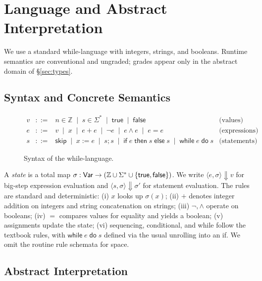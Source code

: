 \section{Language and Abstract Interpretation}
\label{sec:lang-ai}

We use a standard \textsf{while}-language with integers, strings, and booleans. Runtime semantics are conventional and ungraded; grades appear only in the abstract domain of \S\ref{sec:types}.

\subsection{Syntax and Concrete Semantics}

\begin{figure}[t]
\centering
\[
\begin{array}{rcll}
v &::=& n \in \mathbb{Z} \;\mid\; s \in \Sigma^* \;\mid\; \mathsf{true} \;\mid\; \mathsf{false} & \text{(values)}\\[1pt]
e &::=& v \;\mid\; x \;\mid\; e{+}e \;\mid\; \neg e \;\mid\; e \wedge e \;\mid\; e {=} e & \text{(expressions)}\\[1pt]
s &::=& \mathsf{skip} \;\mid\; x {:=} e \;\mid\; s; s \;\mid\; \mathsf{if}\; e\;\mathsf{then}\; s\;\mathsf{else}\; s \;\mid\; \mathsf{while}\; e\;\mathsf{do}\; s & \text{(statements)}
\end{array}
\]
\vspace{-2mm}
\caption{Syntax of the \textsf{while}-language.}
\label{fig:syntax-while}
\end{figure}

A \emph{state} is a total map $\sigma: \mathsf{Var} \to (\mathbb{Z}\cup\Sigma^*\cup\{\mathsf{true},\mathsf{false}\})$.
We write $\langle e,\sigma\rangle \Downarrow v$ for big-step expression evaluation and
$\langle s,\sigma\rangle \Downarrow \sigma'$ for statement evaluation. The rules are standard and deterministic:
(i) $x$ looks up $\sigma(x)$; (ii) $+$ denotes integer addition on integers and string concatenation on strings;
(iii) $\neg,\wedge$ operate on booleans; (iv) $=$ compares values for equality and yields a boolean; (v) assignments update the state; (vi) sequencing, conditional, and while follow the textbook rules, with $\mathsf{while}\;e\;\mathsf{do}\;s$ defined via the usual unrolling into an \textsf{if}.
We omit the routine rule schemata for space.

\subsection{Abstract Interpretation}

